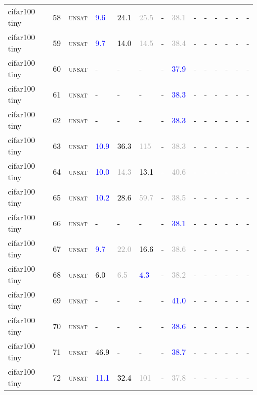 \begin{center}
{\begin{longtable}{@{}llllllllllllll@{}}
cifar100 tiny & 58 & \textsc{unsat} & \textcolor{blue}{9.6} & \textcolor{black}{24.1} & \textcolor{darkgray}{25.5} & - & \textcolor{darkgray}{38.1} & - & - & - & - & - & - \\
cifar100 tiny & 59 & \textsc{unsat} & \textcolor{blue}{9.7} & \textcolor{black}{14.0} & \textcolor{darkgray}{14.5} & - & \textcolor{darkgray}{38.4} & - & - & - & - & - & - \\
cifar100 tiny & 60 & \textsc{unsat} & - & - & - & - & \textcolor{blue}{37.9} & - & - & - & - & - & - \\
cifar100 tiny & 61 & \textsc{unsat} & - & - & - & - & \textcolor{blue}{38.3} & - & - & - & - & - & - \\
cifar100 tiny & 62 & \textsc{unsat} & - & - & - & - & \textcolor{blue}{38.3} & - & - & - & - & - & - \\
cifar100 tiny & 63 & \textsc{unsat} & \textcolor{blue}{10.9} & \textcolor{black}{36.3} & \textcolor{darkgray}{115} & - & \textcolor{darkgray}{38.3} & - & - & - & - & - & - \\
cifar100 tiny & 64 & \textsc{unsat} & \textcolor{blue}{10.0} & \textcolor{darkgray}{14.3} & \textcolor{black}{13.1} & - & \textcolor{darkgray}{40.6} & - & - & - & - & - & - \\
cifar100 tiny & 65 & \textsc{unsat} & \textcolor{blue}{10.2} & \textcolor{black}{28.6} & \textcolor{darkgray}{59.7} & - & \textcolor{darkgray}{38.5} & - & - & - & - & - & - \\
cifar100 tiny & 66 & \textsc{unsat} & - & - & - & - & \textcolor{blue}{38.1} & - & - & - & - & - & - \\
cifar100 tiny & 67 & \textsc{unsat} & \textcolor{blue}{9.7} & \textcolor{darkgray}{22.0} & \textcolor{black}{16.6} & - & \textcolor{darkgray}{38.6} & - & - & - & - & - & - \\
cifar100 tiny & 68 & \textsc{unsat} & \textcolor{black}{6.0} & \textcolor{darkgray}{6.5} & \textcolor{blue}{4.3} & - & \textcolor{darkgray}{38.2} & - & - & - & - & - & - \\
cifar100 tiny & 69 & \textsc{unsat} & - & - & - & - & \textcolor{blue}{41.0} & - & - & - & - & - & - \\
cifar100 tiny & 70 & \textsc{unsat} & - & - & - & - & \textcolor{blue}{38.6} & - & - & - & - & - & - \\
cifar100 tiny & 71 & \textsc{unsat} & \textcolor{black}{46.9} & - & - & - & \textcolor{blue}{38.7} & - & - & - & - & - & - \\
cifar100 tiny & 72 & \textsc{unsat} & \textcolor{blue}{11.1} & \textcolor{black}{32.4} & \textcolor{darkgray}{101} & - & \textcolor{darkgray}{37.8} & - & - & - & - & - & - \\

\end{longtable}}
\end{center}
